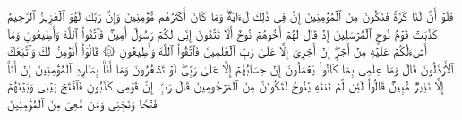 فَلَوۡ أَنَّ لَنَا كَرَّةࣰ فَنَكُونَ مِنَ ٱلۡمُؤۡمِنِینَ%
\stopbuffer
\startbuffer[\q:26:103]
إِنَّ فِی ذَٰلِكَ لَءَایَةࣰۖ وَمَا كَانَ أَكۡثَرُهُم مُّؤۡمِنِینَ%
\stopbuffer
\startbuffer[\q:26:104]
وَإِنَّ رَبَّكَ لَهُوَ ٱلۡعَزِیزُ ٱلرَّحِیمُ%
\stopbuffer
\startbuffer[\q:26:105]
كَذَّبَتۡ قَوۡمُ نُوحٍ ٱلۡمُرۡسَلِینَ%
\stopbuffer
\startbuffer[\q:26:106]
إِذۡ قَالَ لَهُمۡ أَخُوهُمۡ نُوحٌ أَلَا تَتَّقُونَ%
\stopbuffer
\startbuffer[\q:26:107]
إِنِّی لَكُمۡ رَسُولٌ أَمِینࣱ%
\stopbuffer
\startbuffer[\q:26:108]
فَٱتَّقُوا۟ ٱللَّهَ وَأَطِیعُونِ%
\stopbuffer
\startbuffer[\q:26:109]
وَمَاۤ أَسۡءَلُكُمۡ عَلَیۡهِ مِنۡ أَجۡرٍۖ إِنۡ أَجۡرِیَ إِلَّا عَلَىٰ رَبِّ ٱلۡعَٰلَمِینَ%
\stopbuffer
\startbuffer[\q:26:110]
فَٱتَّقُوا۟ ٱللَّهَ وَأَطِیعُونِ%
\stopbuffer
\startbuffer[\q:26:111]
۞ قَالُوۤا۟ أَنُؤۡمِنُ لَكَ وَٱتَّبَعَكَ ٱلۡأَرۡذَلُونَ%
\stopbuffer
\startbuffer[\q:26:112]
قَالَ وَمَا عِلۡمِی بِمَا كَانُوا۟ یَعۡمَلُونَ%
\stopbuffer
\startbuffer[\q:26:113]
إِنۡ حِسَابُهُمۡ إِلَّا عَلَىٰ رَبِّیۖ لَوۡ تَشۡعُرُونَ%
\stopbuffer
\startbuffer[\q:26:114]
وَمَاۤ أَنَا۠ بِطَارِدِ ٱلۡمُؤۡمِنِینَ%
\stopbuffer
\startbuffer[\q:26:115]
إِنۡ أَنَا۠ إِلَّا نَذِیرࣱ مُّبِینࣱ%
\stopbuffer
\startbuffer[\q:26:116]
قَالُوا۟ لَئِن لَّمۡ تَنتَهِ یَٰنُوحُ لَتَكُونَنَّ مِنَ ٱلۡمَرۡجُومِینَ%
\stopbuffer
\startbuffer[\q:26:117]
قَالَ رَبِّ إِنَّ قَوۡمِی كَذَّبُونِ%
\stopbuffer
\startbuffer[\q:26:118]
فَٱفۡتَحۡ بَیۡنِی وَبَیۡنَهُمۡ فَتۡحࣰا وَنَجِّنِی وَمَن مَّعِیَ مِنَ ٱلۡمُؤۡمِنِینَ%
\stopbuffer
